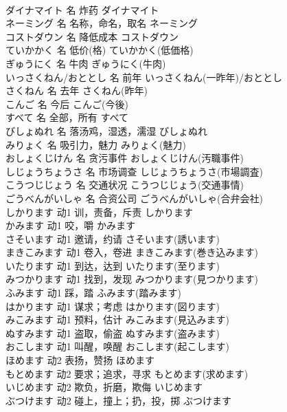 \documentclass[8pt]{extreport}
\begin{document}
\begin{CJK}{UTF8}{min}
\\	ダイナマイト	名	炸药	ダイナマイト	
\\	ネーミング	名	名称，命名，取名	ネーミング	
\\	コストダウン	名	降低成本	コストダウン	
\\	ていかかく	名	低价(格)	ていかかく(低価格)	
\\	ぎゅうにく	名	牛肉	ぎゅうにく(牛肉)	
\\	いっさくねん/おととし	名	前年	いっさくねん(一昨年)/おととし	
\\	さくねん	名	去年	さくねん(昨年)	
\\	こんご	名	今后	こんご(今後)	
\\	すべて	名	全部，所有	すべて	
\\	びしょぬれ	名	落汤鸡，湿透，濡湿	びしょぬれ	
\\	みりょく	名	吸引力，魅力	みりょく(魅力)	
\\	おしょくじけん	名	贪污事件	おしょくじけん(汚職事件)	
\\	しじょうちょうさ	名	市场调查	しじょうちょうさ(市場調査)	
\\	こうつじじょう	名	交通状况	こうつじじょう(交通事情)	
\\	ごうべんがいしゃ	名	合资公司	ごうべんがいしゃ(合弁会社)	
\\	しかります	动1	训，责备，斥责	しかります	
\\	かみます	动1	咬，嚼	かみます	
\\	さそいます	动1	邀请，约请	さそいます(誘います)	
\\	まきこみます	动1	卷入，卷进	まきこみます(巻き込みます)	
\\	いたります	动1	到达，达到	いたります(至ります)	
\\	みつかります	动1	找到，发现	みつかります(見つかります)	
\\	ふみます	动1	踩，踏	ふみます(踏みます)	
\\	はかります	动1	谋求；考虑	はかります(図ります)	
\\	みこみます	动1	预料，估计	みこみます(見込みます)	
\\	ぬすみます	动1	盗取，偷盗	ぬすみます(盗みます)	
\\	おこします	动1	叫醒，唤醒	おこします(起こします)	
\\	ほめます	动2	表扬，赞扬	ほめます	
\\	もとめます	动2	要求；追求，寻求	もとめます(求めます)	
\\	いじめます	动2	欺负，折磨，欺侮	いじめます	
\\	ぶつけます	动2	碰上，撞上；扔，投，掷	ぶつけます	

\end{CJK}
\end{document}
